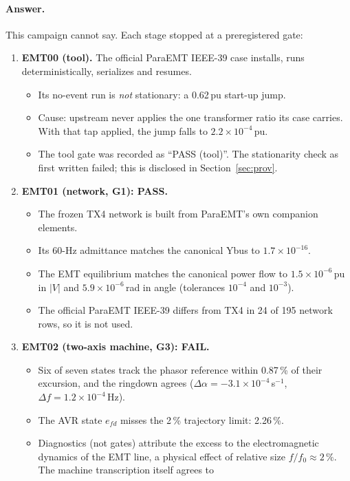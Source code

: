 \documentclass[10pt,a4paper]{article}
\newcommand{\sinv}{\,s$^{-1}$}
\begin{document}
\paragraph{Answer.} This campaign cannot say. Each stage stopped at a
preregistered gate:
\begin{enumerate}
\item \textbf{EMT00 (tool).} The official ParaEMT IEEE-39 case installs, runs
  deterministically, serializes and resumes.
  \begin{itemize}
  \item Its no-event run is \emph{not} stationary: a 0.62\,pu start-up jump.
  \item Cause: upstream never applies the one transformer ratio its case
    carries. With that tap applied, the jump falls to $2.2\times10^{-4}$\,pu.
  \item The tool gate was recorded as ``PASS (tool)''. The stationarity check
    as first written failed; this is disclosed in Section~\ref{sec:prov}.
  \end{itemize}
\item \textbf{EMT01 (network, G1): PASS.}
  \begin{itemize}
  \item The frozen TX4 network is built from ParaEMT's own companion elements.
  \item Its 60-Hz admittance matches the canonical Ybus to
    $1.7\times10^{-16}$.
  \item The EMT equilibrium matches the canonical power flow to
    $1.5\times10^{-6}$\,pu in $|V|$ and $5.9\times10^{-6}$\,rad in angle
    (tolerances $10^{-4}$ and $10^{-3}$).
  \item The official ParaEMT IEEE-39 differs from TX4 in 24 of 195 network
    rows, so it is not used.
  \end{itemize}
\item \textbf{EMT02 (two-axis machine, G3): FAIL.}
  \begin{itemize}
  \item Six of seven states track the phasor reference within 0.87\,\% of
    their excursion, and the ringdown agrees
    ($\Delta\alpha=-3.1\times10^{-4}$\sinv, $\Delta f=1.2\times10^{-4}$\,Hz).
  \item The AVR state $e_{fd}$ misses the 2\,\% trajectory limit: 2.26\,\%.
  \item Diagnostics (not gates) attribute the excess to the electromagnetic
    dynamics of the EMT line, a physical effect of relative size
    $f/f_0\approx2\,\%$. The machine transcription itself agrees to

\end{itemize}
\end{enumerate}
\end{document}
